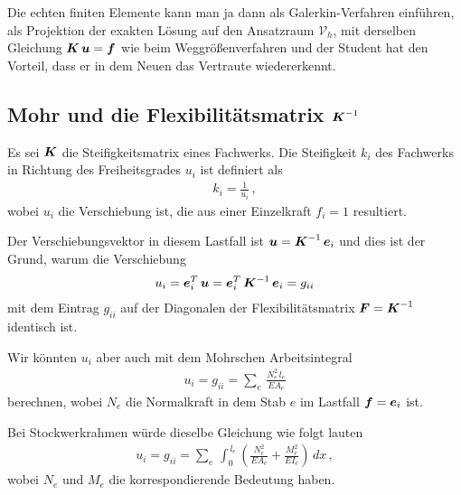 {{\begin{remark}
Die \glq echten\grq{} finiten Elemente kann man ja dann als Galerkin-Verfahren einf\"{u}hren, als Projektion der exakten L\"{o}sung auf den Ansatzraum $\mathcal{V}_h$, mit derselben Gleichung $\mbox{\boldmath $K$}\,\mbox{\boldmath $u$} = \mbox{\boldmath $f$}$ wie beim Weggr\"{o}{\ss}enverfahren und der Student hat den Vorteil, dass er in dem Neuen das Vertraute wiedererkennt.
\end{remark}
\vspace{-0.5cm}
{\textcolor{sectionTitleBlue}{\section{Mohr und die Flexibilit\"{a}tsmatrix $\mbox{\boldmath $K$}^{-1}$}}
Es sei $\mbox{\boldmath $K$}$ die Steifigkeitsmatrix eines Fachwerks. Die Steifigkeit $k_i$ des Fachwerks in Richtung des Freiheitsgrades $u_i$ ist definiert als
\begin{align}
k_i = \frac{1}{u_i}\,,
\end{align}
wobei $u_i$ die Verschiebung ist, die aus einer Einzelkraft $f_i = 1$ resultiert.

Der Verschiebungsvektor in diesem Lastfall ist $\mbox{\boldmath $u$} = \mbox{\boldmath $K$}^{-1}\,\mbox{\boldmath $e$}_i$ und dies ist der Grund, warum die Verschiebung
\begin{align}\label{Eq168}
u_i = \mbox{\boldmath $e$}_i^T\,\mbox{\boldmath $u$} = \mbox{\boldmath $e$}_i^T\,\mbox{\boldmath $K$}^{-1}\,\mbox{\boldmath $e$}_i = g_{ii}
\end{align}
mit dem Eintrag $g_{ii}$ auf der Diagonalen der Flexibilit\"{a}tsmatrix $\mbox{\boldmath $F$} = \mbox{\boldmath $K$}^{-1}$ identisch ist.

Wir k\"{o}nnten $u_i$ aber auch mit dem Mohrschen Arbeitsintegral
\begin{align}
u_i = g_{ii} = \sum_e\,\frac{N_e^2\,l_e}{EA_e}
\end{align}
berechnen, wobei $N_e$ die Normalkraft in dem Stab $e$ im Lastfall $\mbox{\boldmath $f$} = \mbox{\boldmath $e$}_i$ ist.

Bei Stockwerkrahmen w\"{u}rde dieselbe Gleichung wie folgt lauten
\begin{align}
u_i = g_{ii} =  \sum_e\,\int_0^{\,l_e} (\frac{N_e^2}{EA_e} + \frac{M_e^2}{EI_e})\,dx\,,
\end{align}
wobei $N_e$ und $M_e$ die korrespondierende Bedeutung haben.

}}}

